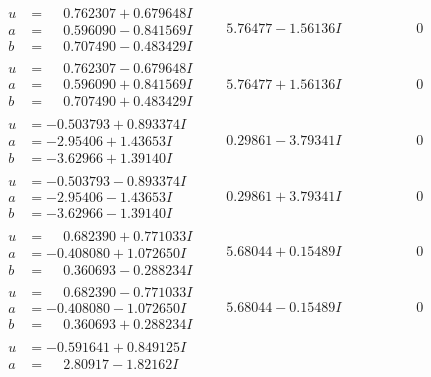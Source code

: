 \documentclass[1p]{elsarticle_modified}
\theoremstyle{definition}
\begin{document}
$$\begin{array}{c|c|c}
 \hline 
\begin{aligned}
u &= \phantom{-}0.762307 + 0.679648 I \\
a &= \phantom{-}0.596090 - 0.841569 I \\
b &= \phantom{-}0.707490 - 0.483429 I\end{aligned}
 & \phantom{-}5.76477 - 1.56136 I & \phantom{-0.000000 } 0 \\ \hline\begin{aligned}
u &= \phantom{-}0.762307 - 0.679648 I \\
a &= \phantom{-}0.596090 + 0.841569 I \\
b &= \phantom{-}0.707490 + 0.483429 I\end{aligned}
 & \phantom{-}5.76477 + 1.56136 I & \phantom{-0.000000 } 0 \\ \hline\begin{aligned}
u &= -0.503793 + 0.893374 I \\
a &= -2.95406 + 1.43653 I \\
b &= -3.62966 + 1.39140 I\end{aligned}
 & \phantom{-}0.29861 - 3.79341 I & \phantom{-0.000000 } 0 \\ \hline\begin{aligned}
u &= -0.503793 - 0.893374 I \\
a &= -2.95406 - 1.43653 I \\
b &= -3.62966 - 1.39140 I\end{aligned}
 & \phantom{-}0.29861 + 3.79341 I & \phantom{-0.000000 } 0 \\ \hline\begin{aligned}
u &= \phantom{-}0.682390 + 0.771033 I \\
a &= -0.408080 + 1.072650 I \\
b &= \phantom{-}0.360693 - 0.288234 I\end{aligned}
 & \phantom{-}5.68044 + 0.15489 I & \phantom{-0.000000 } 0 \\ \hline\begin{aligned}
u &= \phantom{-}0.682390 - 0.771033 I \\
a &= -0.408080 - 1.072650 I \\
b &= \phantom{-}0.360693 + 0.288234 I\end{aligned}
 & \phantom{-}5.68044 - 0.15489 I & \phantom{-0.000000 } 0 \\ \hline\begin{aligned}
u &= -0.591641 + 0.849125 I \\
a &= \phantom{-}2.80917 - 1.82162 I \\

\end{aligned}
\end{array}$$
\end{document}
